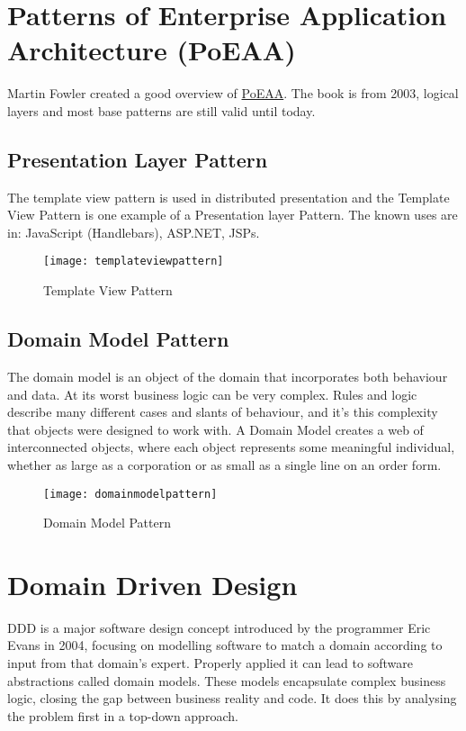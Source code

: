 \section{Patterns of Enterprise Application Architecture (PoEAA)}
Martin Fowler created a good overview of \href{https://www.martinfowler.com/eaaCatalog/index.html}{PoEAA}. The book is from 2003, logical layers and most base patterns are still valid until today. 

\subsection{Presentation Layer Pattern}
The template view pattern is used in distributed presentation and the Template View Pattern is one example of a Presentation layer Pattern. The known uses are in: JavaScript (Handlebars), ASP.NET, JSPs.

\begin{figure}[H]
  \center
  \texttt{[image: templateviewpattern]}
  \caption{Template View Pattern}
\end{figure}

\subsection{Domain Model Pattern}
The domain model is an object of the domain that incorporates both behaviour and data. At its worst business logic can be very complex. Rules and logic describe many different cases and slants of behaviour, and it's this complexity that objects were designed to work with. A Domain Model creates a web of interconnected objects, where each object represents some meaningful individual, whether as large as a corporation or as small as a single line on an order form.

\begin{figure}[H]
  \center
  \texttt{[image: domainmodelpattern]}
  \caption{Domain Model Pattern}
\end{figure}

\section{Domain Driven Design}
DDD is a major software design concept introduced by the programmer Eric Evans in 2004, focusing on modelling software to match a domain according to input from that domain's expert. Properly applied it can lead to software abstractions called domain models. These models encapsulate complex business logic, closing the gap between business reality and code. It does this by analysing the problem first in a top-down approach.

